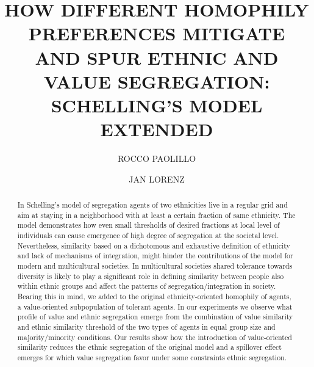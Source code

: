 \documentclass{ws-acs}
\begin{document}
\makeatletter
\def\@biblabel#1{[#1]}
\makeatother


%
\catchline{}{}{}{}{}
%

\title{HOW DIFFERENT HOMOPHILY PREFERENCES MITIGATE AND SPUR ETHNIC AND  VALUE  SEGREGATION: SCHELLING'S MODEL EXTENDED}

\author{ROCCO PAOLILLO}

\address{Bremen International Graduate School of Social Sciences, Jacobs University Bremen \& University of Bremen, \\
Campus Ring 1,
Bremen, 28759,
Germany\\
rpaolillo@bigsss-bremen.de}

\author{JAN LORENZ}

\address{Bremen International Graduate School of Social Sciences, Jacobs University Bremen\\ Campus Ring 1
Bremen, 28759,
Germany\\
j.lorenz@jacobs-university.de}

\maketitle

\begin{history}
\end{history}

\begin{abstract}
In Schelling's model of segregation agents of two ethnicities live in a regular grid and aim at staying in a neighborhood with at least a certain fraction of same ethnicity. The model demonstrates how even small thresholds of desired fractions at local level of individuals can cause emergence of high degree of segregation at the societal level. Nevertheless, similarity based on a dichotomous and exhaustive definition of ethnicity and lack of mechanisms of integration, might hinder the contributions of the model for modern and multicultural societies. In multicultural societies shared tolerance towards diversity is likely to play a significant role in defining similarity between people also within ethnic groups and affect the patterns of segregation/integration in society. Bearing this in mind, we added to the original ethnicity-oriented homophily of agents, a value-oriented subpopulation of tolerant agents. In our experiments we observe what profile of value and ethnic segregation emerge from the combination of value similarity and ethnic similarity threshold of the two types of agents in equal group size and majority/minority conditions. Our results show how the introduction of value-oriented similarity reduces the ethnic segregation of the original model and a spillover effect emerges for which value segregation favor under some constraints ethnic segregation.
\end{abstract}
\end{document}
